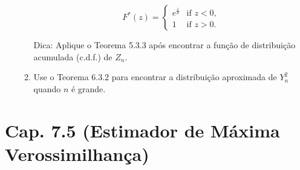 \documentclass[leqno, 12pt]{article}
\begin{document}
\begin{enumerate}
\begin{enumerate}
        \[ F^*(z) = \begin{cases}
        e^{\frac{z}{\theta}} & \text{if } z < 0, \\
        1 & \text{if } z > 0.
        \end{cases} \]
        
        Dica: Aplique o Teorema 5.3.3 após encontrar a função de distribuição acumulada (c.d.f.) de \( Z_n \).

    \item Use o Teorema 6.3.2 para encontrar a distribuição aproximada de \(Y_{n}^2\) quando \(n\) é grande.

\end{enumerate}

\end{enumerate}

\section*{Cap. 7.5 (Estimador de Máxima Verossimilhança)}
\end{document}
